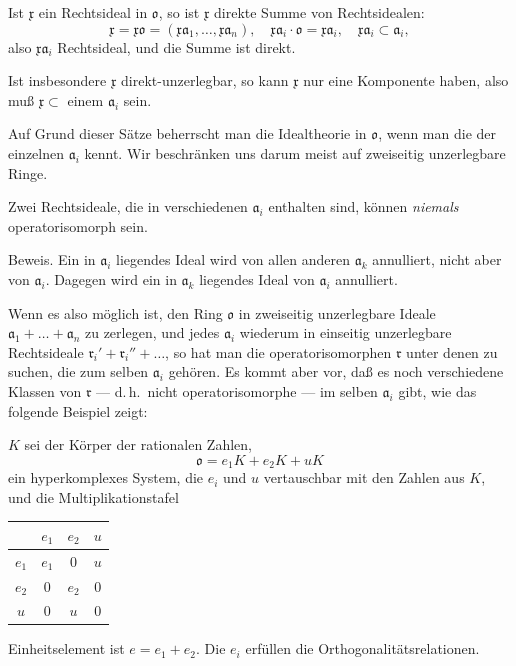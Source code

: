 \documentclass[12pt,a4paper]{article}
\theoremstyle{definition}
\begin{document}
Ist $\mathfrak{x}$ ein Rechtsideal in $\mathfrak{o}$, so ist $\mathfrak{x}$
direkte Summe von Rechtsidealen:
\[
\mathfrak{x} = \mathfrak{x}\mathfrak{o} =
(\mathfrak{x}\mathfrak{a}_1, \dots, \mathfrak{x}\mathfrak{a}_n),
\quad \mathfrak{x}\mathfrak{a}_i \cdot \mathfrak{o} =
\mathfrak{x}\mathfrak{a}_i, \quad
\mathfrak{x}\mathfrak{a}_i \subset \mathfrak{a}_i,
\]
also $\mathfrak{x}\mathfrak{a}_i$ Rechtsideal, und die Summe ist direkt.

Ist insbesondere $\mathfrak{x}$ direkt-unzerlegbar, so kann $\mathfrak{x}$
nur eine Komponente haben, also mu\ss{} $\mathfrak{x} \subset$ einem
$\mathfrak{a}_i$ sein.

Auf Grund dieser S\"atze beherrscht man die Idealtheorie in
$\mathfrak{o}$, wenn man die der einzelnen $\mathfrak{a}_i$ kennt. Wir
beschr\"anken uns darum meist auf zweiseitig unzerlegbare Ringe.

Zwei Rechtsideale, die in verschiedenen $\mathfrak{a}_i$ enthalten sind,
k\"onnen \textit{niemals} operatorisomorph sein.

Beweis. Ein in $\mathfrak{a}_i$ liegendes Ideal wird von allen anderen
$\mathfrak{a}_k$ annulliert, nicht aber von $\mathfrak{a}_i$. Dagegen
wird ein in $\mathfrak{a}_k$ liegendes Ideal von $\mathfrak{a}_i$
annulliert.

Wenn es also m\"oglich ist, den Ring $\mathfrak{o}$ in zweiseitig
unzerlegbare Ideale $\mathfrak{a}_1 + \dots + \mathfrak{a}_n$ zu
zerlegen, und jedes $\mathfrak{a}_i$ wiederum in einseitig unzerlegbare
Rechtsideale $\mathfrak{r}_i' + \mathfrak{r}_i'' + \dots$, so hat man
die operatorisomorphen $\mathfrak{r}$ unter denen zu suchen, die zum
selben $\mathfrak{a}_i$ geh\"oren. Es kommt aber vor, da\ss{} es noch
verschiedene Klassen von $\mathfrak{r}$ --- d.\,h.\ nicht
operatorisomorphe --- im selben $\mathfrak{a}_i$ gibt, wie das folgende
Beispiel zeigt:

$K$ sei der K\"orper der rationalen Zahlen,
\[
\mathfrak{o} = e_1 K + e_2 K + uK
\]
ein hyperkomplexes System, die $e_i$ und $u$ vertauschbar mit den Zahlen
aus $K$, und die Multiplikationstafel
\begin{center}
\begin{tabular}{c|ccc}
  & $e_1$ & $e_2$ & $u$ \\
\hline
$e_1$ & $e_1$ & $0$ & $u$ \\
$e_2$ & $0$ & $e_2$ & $0$ \\
$u$   & $0$ & $u$ & $0$
\end{tabular}
\end{center}
Einheitselement ist $e = e_1 + e_2$. Die $e_i$ erf\"ullen die
Orthogonalit\"atsrelationen.
\end{document}
